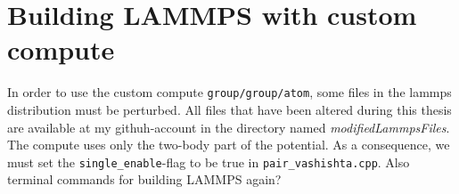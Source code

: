 \documentclass[twoside,english]{uiofysmaster}
\begin{document}
\section{Building LAMMPS with custom compute}
In order to use the custom compute \texttt{group/group/atom}, some files in the lammps distribution must be perturbed.  
All files that have been altered during this thesis are available at my githuh-account in the directory named \textit{modifiedLammpsFiles}.  
The compute uses only the two-body part of the potential. 
As a consequence, we must set the \texttt{single\_enable}-flag to be true in \texttt{pair\_vashishta.cpp}. 
Also
terminal commands for building LAMMPS again?







\end{document}
